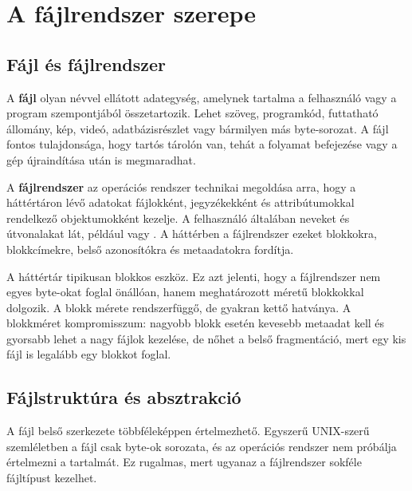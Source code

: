 \begin{center}

\end{center}

\section{A fájlrendszer szerepe}

\subsection{Fájl és fájlrendszer}

A \textbf{fájl} olyan névvel ellátott adategység, amelynek tartalma a felhasználó vagy a program szempontjából összetartozik. Lehet szöveg, programkód, futtatható állomány, kép, videó, adatbázisrészlet vagy bármilyen más byte-sorozat. A fájl fontos tulajdonsága, hogy tartós tárolón van, tehát a folyamat befejezése vagy a gép újraindítása után is megmaradhat.

A \textbf{fájlrendszer} az operációs rendszer technikai megoldása arra, hogy a háttértáron lévő adatokat fájlokként, jegyzékekként és attribútumokkal rendelkező objektumokként kezelje. A felhasználó általában neveket és útvonalakat lát, például  vagy . A háttérben a fájlrendszer ezeket blokkokra, blokkcímekre, belső azonosítókra és metaadatokra fordítja.



A háttértár tipikusan blokkos eszköz. Ez azt jelenti, hogy a fájlrendszer nem egyes byte-okat foglal önállóan, hanem meghatározott méretű blokkokkal dolgozik. A blokk mérete rendszerfüggő, de gyakran kettő hatványa. A blokkméret kompromisszum: nagyobb blokk esetén kevesebb metaadat kell és gyorsabb lehet a nagy fájlok kezelése, de nőhet a belső fragmentáció, mert egy kis fájl is legalább egy blokkot foglal.

\subsection{Fájlstruktúra és absztrakció}

A fájl belső szerkezete többféleképpen értelmezhető. Egyszerű UNIX-szerű szemléletben a fájl csak byte-ok sorozata, és az operációs rendszer nem próbálja értelmezni a tartalmát. Ez rugalmas, mert ugyanaz a fájlrendszer sokféle fájltípust kezelhet.

